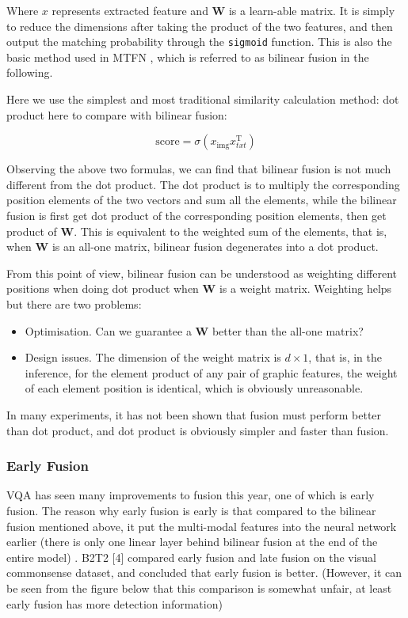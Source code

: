 Where $x$ represents extracted feature and $\mathbf{W}$ is a learn-able matrix. It is simply to reduce the dimensions after taking the product of the two features, and then output the matching probability through the \verb|sigmoid| function. This is also the basic method used in MTFN \cite{MTFN}, which is referred to as bilinear fusion in the following.

Here we use the simplest and most traditional similarity calculation method: dot product here to compare with bilinear fusion:

$$
\text {score}=\sigma\left(x_{\text {img}} x_{t x t}^{\mathrm{T}}\right)
$$

Observing the above two formulas, we can find that bilinear fusion is not much different from the dot product. The dot product is to multiply the corresponding position elements of the two vectors and sum all the elements, while the bilinear fusion is first get dot product of the corresponding position elements, then get product of $\mathbf{W}$. This is equivalent to the weighted sum of the elements, that is, when $\mathbf{W}$ is an all-one matrix, bilinear fusion degenerates into a dot product.

From this point of view, bilinear fusion can be understood as weighting different positions when doing dot product when $\mathbf{W}$ is a weight matrix. Weighting helps but there are two problems:

\begin{itemize}
    \item Optimisation. Can we guarantee a $\mathbf{W}$ better than the all-one matrix?
    \item Design issues. The dimension of the weight matrix is $d\times1$, that is, in the inference, for the element product of any pair of graphic features, the weight of each element position is identical, which is obviously unreasonable.
\end{itemize}

In many experiments, it has not been shown that fusion must perform better than dot product, and dot product is obviously simpler and faster than fusion.


\subsubsection{Early Fusion}
VQA has seen many improvements to fusion this year, one of which is early fusion. The reason why early fusion is early is that compared to the bilinear fusion mentioned above, it put the multi-modal features into the neural network earlier (there is only one linear layer behind bilinear fusion at the end of the entire model) . B2T2 [4] compared early fusion and late fusion on the visual commonsense dataset, and concluded that early fusion is better. (However, it can be seen from the figure below that this comparison is somewhat unfair, at least early fusion has more detection information)

